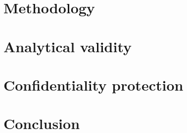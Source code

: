 \documentclass{article}
\begin{document}
\section{Methodology}
\label{sec:methodology}


\section{Analytical validity}
\label{sec:analytic}


\section{Confidentiality protection}
\label{sec:confidentiality}


\section{Conclusion}
\label{sec:conclusion}




\newpage


\printbibliography


\newpage


\end{document}
